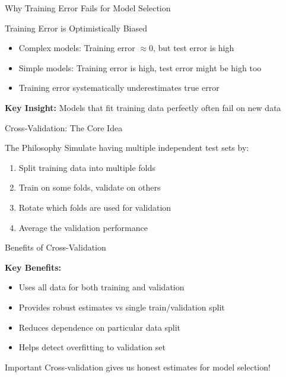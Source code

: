 \documentclass{beamer}
\begin{document}
\begin{frame}{Why Training Error Fails for Model Selection}
\begin{examplebox}{Training Error is Optimistically Biased}
\begin{itemize}
\item Complex models: Training error $\approx 0$, but test error is high
\item Simple models: Training error is high, test error might be high too
\item Training error systematically underestimates true error
\end{itemize}
\end{examplebox}

\begin{keypointsbox}
\textbf{Key Insight:} Models that fit training data perfectly often fail on new data
\end{keypointsbox}
\end{frame}

\begin{frame}{Cross-Validation: The Core Idea}
\begin{definitionbox}{The Philosophy}
Simulate having multiple independent test sets by:
\begin{enumerate}
\item Split training data into multiple folds
\item Train on some folds, validate on others
\item Rotate which folds are used for validation
\item Average the validation performance
\end{enumerate}
\end{definitionbox}
\end{frame}

\begin{frame}{Benefits of Cross-Validation}
\begin{keypointsbox}
\textbf{Key Benefits:}
\begin{itemize}
\item Uses all data for both training and validation
\item Provides robust estimates vs single train/validation split
\item Reduces dependence on particular data split
\item Helps detect overfitting to validation set
\end{itemize}
\end{keypointsbox}

\begin{alertbox}{Important}
Cross-validation gives us honest estimates for model selection!
\end{alertbox}
\end{frame}
\end{document}
